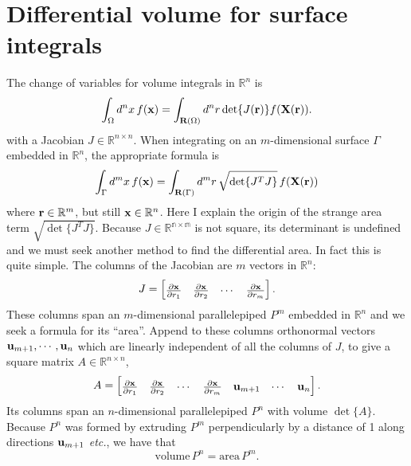 \section{Differential volume for surface integrals}

The change of variables for volume integrals in $\mathbb{R}^n$ is
%
\begin{equation}
\int_\Omega d^n x \, f(\textbf{x}) = \int_{\textbf{R} (\Omega)} d^n r \det \{ J(\textbf{r}) \} f(\textbf{X} (\textbf{r})).
\end{equation}
%
with a Jacobian $J \in \mathbb{R}^{n \times n}$.  When integrating on an $m$-dimensional surface $\Gamma$ embedded in $\mathbb{R}^n$, the appropriate formula is
%
\begin{equation}
\int_\Gamma d^m x \, f(\textbf{x}) = \int_{\textbf{R}(\Gamma)} d^m r \, \sqrt{\det \{ J^T J \} }\,  f(\textbf{X}(\textbf{r}))
\label{eqn:surface_integral}
\end{equation}
%
where $\textbf{r} \in \mathbb R^m$, but still $\textbf{x} \in \mathbb R^n$.  Here I explain the origin of the strange area term $\sqrt{ \det \{J^T J \} }$.  Because $J \in \mathbb{R^{n \times m}}$ is not square, its determinant is undefined and we must seek another method to find the differential area.  In fact this is quite simple.  The columns of the Jacobian are $m$ vectors in $\mathbb R^n$:
%
\begin{equation}
\renewcommand\arraystretch{1.5}
J = 
\begin{bmatrix}
\pp{\ve x}{r_1} & \pp{\ve x}{r_2} & \cdots & \pp{\ve x}{r_m}
\end{bmatrix}.
\end{equation}
%
These columns span an $m$-dimensional parallelepiped $P^m$ embedded in $\mathbb R^n$ and we seek a formula for its ``area''.  Append to these columns orthonormal vectors $\textbf{u}_{m+1}, \cdots, \textbf{u}_n$ which are linearly independent of all the columns of $J$, to give a square matrix $A \in \mathbb R^{n \times n}$,
%
\begin{equation}
\renewcommand\arraystretch{1.5}
A = 
\begin{bmatrix}
\pp{\ve x}{r_1} & \pp{\ve x}{r_2} & \cdots & \pp{\ve x}{r_m} &
\ve u_{m+1} & \cdots & \ve u_{n}
\end{bmatrix}.
\end{equation}
%
Its columns span an $n$-dimensional parallelepiped $P^n$ with volume $\det \{ A \}$.  Because $P^n$ was formed by extruding $P^m$ perpendicularly by a distance of 1 along directions $\textbf{u}_{m+1}$ \emph{etc.}, we have that
%
\begin{equation}
\mathrm{volume} \, P^n = \mathrm{area} \, P^m.
\end{equation}
